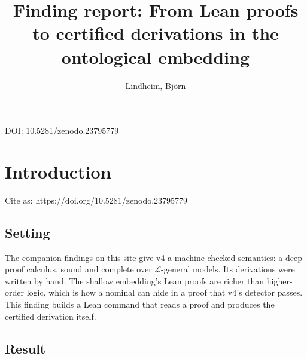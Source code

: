 \documentclass{article}
\title{Finding report: From Lean proofs to certified derivations in the ontological embedding}
\author{Lindheim, Björn}
\date{}
\begin{document}
\maketitle
\begin{center}DOI: 10.5281/zenodo.23795779\end{center}
\section{Introduction}
\label{sec:ontological-proof-translation}

Cite as: https://doi.org/10.5281/zenodo.23795779

\subsection*{Setting}

The companion findings on this site give v4 \cite{benzmueller2026nominals} a machine-checked
semantics: a deep proof calculus, sound and complete over $\mathcal L$-general models. Its
derivations were written by hand. The shallow embedding's Lean proofs are richer than
higher-order logic, which is how a nominal can hide in a proof that v4's detector passes. This
finding builds a Lean command that reads a proof and produces the certified derivation itself.

\subsection*{Result}
\end{document}
